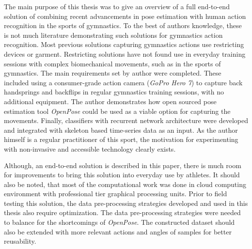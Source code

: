 \begin{comment}

    - Analyze full battery, higher accuracy
    - Build regressor model, PD severity









\end{comment}

The main purpose of this thesis was to give an overview of a full end-to-end solution of combining recent advancements in pose estimation with human action recognition in the sports of gymnastics. To the best of authors knowledge, these is not much literature demonstrating such solutions for gymnastics action recognition. Most previous solutions capturing gymnastics actions use restricting devices or garment. Restricting solutions have not found use in everyday training sessions with complex biomechanical movements, such as in the sports of gymnastics. The main requirements set by author were completed. These included using a consumer-grade action camera (\textit{GoPro Hero 7}) to capture back handsprings and backflips in regular gymnastics training sessions, with no additional equipment. The author demonstrates how open sourced pose estimation tool \textit{OpenPose} could be used as a viable option for capturing the movements. Finally, classifiers with recurrent network architecture were developed and integrated with skeleton based time-series data as an input. As the author himself is a regular practitioner of this sport, the motivation for experimenting with non-invasive and accessible technology clearly exists. 

Although, an end-to-end solution is described in this paper, there is much room for improvements to bring this solution into everyday use by athletes. It should also be noted, that most of the computational work was done in cloud computing environment with professional tier graphical processing units. Prior to field testing this solution, the data pre-processing strategies developed and used in this thesis also require optimization. The data pre-processing strategies were needed to balance for the shortcomings of \textit{OpenPose}. The constructed dataset should also be extended with more relevant actions and angles of samples for better reusability.


